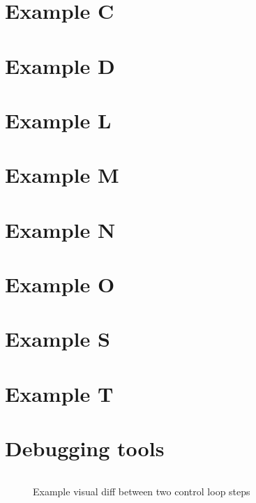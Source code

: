\section{Example C}

\section{Example D}

\section{Example L}

\section{Example M}

\section{Example N}

\section{Example O}

\section{Example S}

\section{Example T}

\section{Debugging tools}

\begin{figure}[h]
    \inputminted[fontsize=\tiny]{diff}{Figures/APIA_Architecture/Examples/Authorization/Example_A/diff_test.snippet.txt}
    \caption{Example visual diff between two control loop steps}
    \label{fig:apia_diff_test}
\end{figure}
